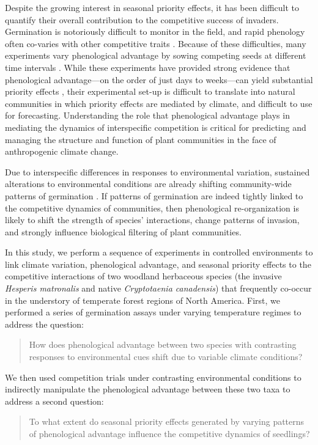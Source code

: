 \documentclass{article}[11pt]
\begin{document}
Despite the growing interest in seasonal priority effects, it has been difficult to quantify their overall contribution to the competitive success of invaders. Germination is notoriously difficult to monitor in the field, and rapid phenology often co-varies with other competitive traits \citep{Dickson2012,Milbau:2003vt,HAO:2009vh}. %
Because of these difficulties, many experiments vary phenological advantage by sowing competing seeds at different time intervals \citep{Young:2017aa}. While these experiments have provided strong evidence that phenological advantage---on the order of just days to weeks---can yield substantial priority effects \citep{Weidlich:2020aa}, their experimental set-up is difficult to translate into natural communities in which priority effects are mediated by climate, and difficult to use for forecasting. %
Understanding the role that phenological advantage plays in mediating the dynamics of interspecific competition is critical for predicting and managing the structure and function of plant communities in the face of anthropogenic climate change. 

Due to interspecific differences in responses to environmental variation, sustained alterations to environmental conditions are already shifting community-wide patterns of germination \citep{Walck2011}. If patterns of germination are indeed tightly linked to the competitive dynamics of communities, then phenological re-organization is likely to shift the strength of species' interactions, change patterns of invasion, and strongly influence biological filtering of plant communities. 

In this study, we perform a sequence of experiments in controlled environments to link climate variation, phenological advantage, and seasonal priority effects to the competitive interactions of two woodland herbaceous species (the invasive \textit{Hesperis matronalis} and native \textit{Cryptotaenia canadensis}) that frequently co-occur in the understory of temperate forest regions of North America. First, we performed a series of germination assays under varying temperature regimes to address the question: 
\begin{quote}How does phenological advantage between two species with contrasting responses to environmental cues shift due to variable climate conditions?\end{quote}
We then used competition trials under contrasting environmental conditions to indirectly manipulate the phenological advantage between these two taxa to address a second question: \begin{quote}To what extent do seasonal priority effects generated by varying patterns of phenological advantage influence the competitive dynamics of seedlings?\end{quote}
\end{document}
